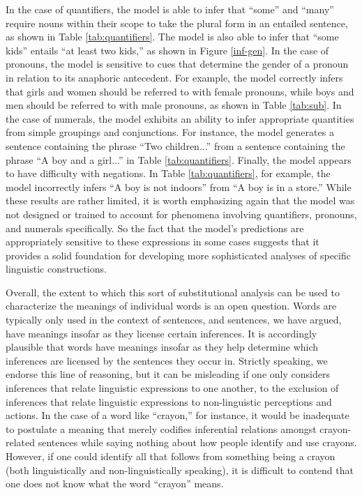 \documentclass[utf8]{frontiersSCNS} %
\begin{document}
In the case of quantifiers, the model is able to infer that ``some'' and ``many'' require nouns within their scope to take the plural form in an entailed sentence, as shown in Table \ref{tab:quantifiers}. The model is also able to infer that ``some kids'' entails ``at least two kids,'' as shown in Figure \ref{inf-gen}. In the case of pronouns, the model is sensitive to cues that determine the gender of a pronoun in relation to its anaphoric antecedent. For example, the model correctly infers that girls and women should be referred to with female pronouns, while boys and men should be referred to with male pronouns, as shown in Table \ref{tab:sub}. In the case of numerals, the model exhibits an ability to infer appropriate quantities from simple groupings and conjunctions. For instance, the model generates a sentence containing the phrase ``Two children...'' from a sentence containing the phrase ``A boy and a girl...'' in Table \ref{tab:quantifiers}. Finally, the model appears to have difficulty with negations. In Table \ref{tab:quantifiers}, for example, the model incorrectly infers ``A boy is not indoors'' from ``A boy is in a store.'' While these results are rather limited, it is worth emphasizing again that the model was not designed or trained to account for phenomena involving quantifiers, pronouns, and numerals specifically. So the fact that the model's predictions are appropriately sensitive to these expressions in some cases suggests that it provides a solid foundation for developing more sophisticated analyses of specific linguistic constructions. 

Overall, the extent to which this sort of substitutional analysis can be used to characterize the meanings of individual words is an open question. Words are typically only used in the context of sentences, and sentences, we have argued, have meanings insofar as they license certain inferences. It is accordingly plausible that words have meanings insofar as they help determine which inferences are licensed by the sentences they occur in. Strictly speaking, we endorse this line of reasoning, but it can be misleading if one only considers inferences that relate linguistic expressions to one another, to the exclusion of inferences that relate linguistic expressions to non-linguistic perceptions and actions. In the case of a word like ``crayon,'' for instance, it would be inadequate to postulate a meaning that merely codifies inferential relations amongst crayon-related sentences while saying nothing about how people identify and use crayons. However, if one could identify all that follows from something being a crayon (both linguistically and non-linguistically speaking), it is difficult to contend that one does not know what the word ``crayon'' means.
\end{document}
